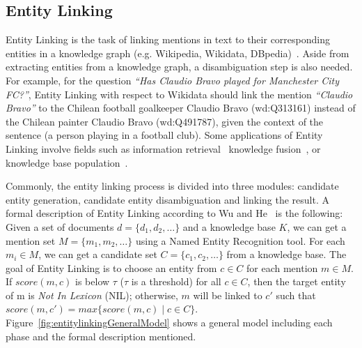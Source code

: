 \subsection{Entity Linking}
\label{cap3:infExtr/entityLinking}
Entity Linking is the task of linking mentions in text to their corresponding entities in a 
knowledge graph (e.g. Wikipedia, Wikidata, DBpedia)~\cite{EL:survey-WuHH18}. Aside from 
extracting entities from a knowledge graph, a disambiguation step is also needed. For example, 
for the question \textit{“Has Claudio Bravo played for Manchester City FC?”}, Entity Linking 
with respect to Wikidata should link the mention \textit{“Claudio Bravo”} to the Chilean 
football goalkeeper Claudio Bravo (wd:Q313161) instead of the Chilean painter Claudio Bravo 
(wd:Q491787), given the context of the sentence (a person playing in a football club). Some 
applications of Entity Linking involve fields such as information 
retrieval~\cite{infExtr:CornoltiFCRS16, infExtr:BlancoOM15, infExtr:BollegalaMI07} knowledge 
fusion~\cite{infExtr:DongGHHMSZ15, infExtr:BohmFHLMNEHHS12}, or knowledge base 
population~\cite{infExtr:RaoMD13, infExtr:DredzeMRGF10, infExtr:FreedmanMM17}.

Commonly, the entity linking process is divided into three modules: candidate entity 
generation, candidate entity disambiguation and linking the result. A formal description of 
Entity Linking according to Wu and He~\cite{EL:survey-WuHH18} is the following: Given a set of 
documents $d=\{d_1,d_2,\ldots\}$ and a knowledge base $K$, we can get a mention set 
$M=\{m_1, m_2,\ldots\}$ using a Named Entity Recognition tool. For each $m_i \in M$, we can 
get a candidate set $C=\{c_1, c_2,\ldots\}$ from a knowledge base. The goal of Entity Linking 
is to choose an entity from $c \in C$ for each mention $m \in M$. If $score(m,c)$ is below 
$\tau$ ($\tau$ is a threshold) for all $c \in C$, then the target entity of m is 
\textit{Not In Lexicon} (NIL); otherwise, $m$ will be linked to $c'$ such that 
$score(m,c')=max\{score(m,c) \mid c\in C \}$. Figure~\ref{fig:entitylinkingGeneralModel} shows a 
general model including each phase and the formal description mentioned.


